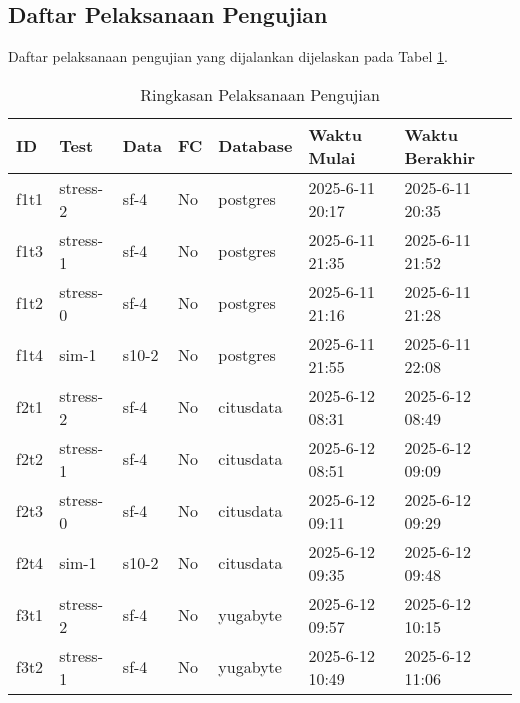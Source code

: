 \subsection{Daftar Pelaksanaan Pengujian}

Daftar pelaksanaan pengujian yang dijalankan dijelaskan pada Tabel \ref{tab:execution-summary}.

\begin{table}[htbp]
    \centering
    \caption{Ringkasan Pelaksanaan Pengujian}
    \label{tab:execution-summary}
    \begin{tabular}{|l|l|l|l|l|l|l|}
        \hline
        \textbf{ID} & \textbf{Test} & \textbf{Data} & \textbf{FC} & \textbf{Database} & \textbf{Waktu Mulai} & \textbf{Waktu Berakhir} \\ \hline
        f1t1        & stress-2      & sf-4          & No          & postgres          & 2025-6-11 20:17      & 2025-6-11 20:35         \\ \hline
        f1t3        & stress-1      & sf-4          & No          & postgres          & 2025-6-11 21:35      & 2025-6-11 21:52         \\ \hline
        f1t2        & stress-0      & sf-4          & No          & postgres          & 2025-6-11 21:16      & 2025-6-11 21:28         \\ \hline
        f1t4        & sim-1         & s10-2         & No          & postgres          & 2025-6-11 21:55      & 2025-6-11 22:08         \\ \hline
        f2t1        & stress-2      & sf-4          & No          & citusdata         & 2025-6-12 08:31      & 2025-6-12 08:49         \\ \hline
        f2t2        & stress-1      & sf-4          & No          & citusdata         & 2025-6-12 08:51      & 2025-6-12 09:09         \\ \hline
        f2t3        & stress-0      & sf-4          & No          & citusdata         & 2025-6-12 09:11      & 2025-6-12 09:29         \\ \hline
        f2t4        & sim-1         & s10-2         & No          & citusdata         & 2025-6-12 09:35      & 2025-6-12 09:48         \\ \hline
        f3t1        & stress-2      & sf-4          & No          & yugabyte          & 2025-6-12 09:57      & 2025-6-12 10:15         \\ \hline
        f3t2        & stress-1      & sf-4          & No          & yugabyte          & 2025-6-12 10:49      & 2025-6-12 11:06         \\ \hline

\end{tabular}
\end{table}
